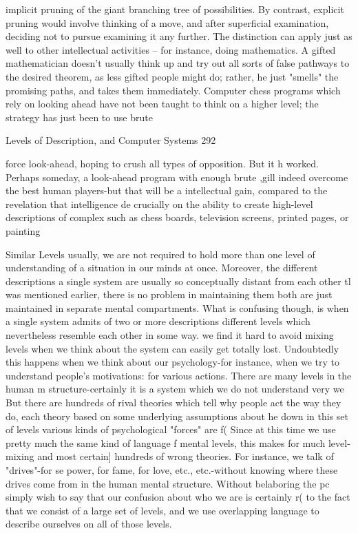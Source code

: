 implicit pruning of the giant branching tree of possibilities. By contrast, explicit pruning
would involve thinking of a move, and after superficial examination, deciding not to
pursue examining it any further.
         The distinction can apply just as well to other intellectual activities -- for instance,
doing mathematics. A gifted mathematician doesn't usually think up and try out all sorts
of false pathways to the desired theorem, as less gifted people might do; rather, he just
"smells" the promising paths, and takes them immediately.
         Computer chess programs which rely on looking ahead have not been taught to
think on a higher level; the strategy has just been to use brute




Levels of Description, and Computer Systems                                                 292

force look-ahead, hoping to crush all types of opposition. But it h worked. Perhaps
someday, a look-ahead program with enough brute ,gill indeed overcome the best human
players-but that will be a intellectual gain, compared to the revelation that intelligence de
crucially on the ability to create high-level descriptions of complex such as chess boards,
television screens, printed pages, or painting

                                     Similar Levels
usually, we are not required to hold more than one level of understanding of a situation in
our minds at once. Moreover, the different descriptions a single system are usually so
conceptually distant from each other tl was mentioned earlier, there is no problem in
maintaining them both are just maintained in separate mental compartments. What is
confusing though, is when a single system admits of two or more descriptions different
levels which nevertheless resemble each other in some way. we find it hard to avoid
mixing levels when we think about the system can easily get totally lost.
        Undoubtedly this happens when we think about our psychology-for instance,
when we try to understand people's motivations: for various actions. There are many
levels in the human m structure-certainly it is a system which we do not understand very
we But there are hundreds of rival theories which tell why people act the way they do,
each theory based on some underlying assumptions about he down in this set of levels
various kinds of psychological "forces" are f( Since at this time we use pretty much the
same kind of language f mental levels, this makes for much level-mixing and most
certain] hundreds of wrong theories. For instance, we talk of "drives"-for se power, for
fame, for love, etc., etc.-without knowing where these drives come from in the human
mental structure. Without belaboring the pc simply wish to say that our confusion about
who we are is certainly r( to the fact that we consist of a large set of levels, and we use
overlapping language to describe ourselves on all of those levels.

